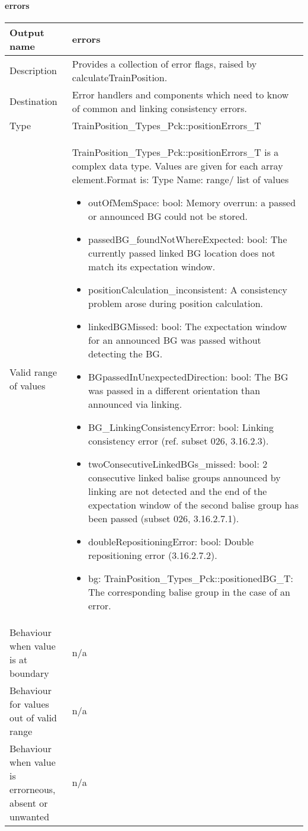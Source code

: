 \paragraph{errors}

\begin{longtable}{p{}p{}}
\toprule
Output name				& errors \\

\midrule
Description				& Provides a collection of error flags, raised by calculateTrainPosition.  \newline
  \\
\midrule
Destination				& Error handlers and components which need to know of common and linking consistency errors.  \\ 
\midrule
Type					& TrainPosition\_Types\_Pck::positionErrors\_T \\  
\midrule
Valid range of values	& TrainPosition\_Types\_Pck::positionErrors\_T is a complex data type. Values are given for each array element.\newline Format is: Type Name: range/ list of values
\begin{itemize}
\item outOfMemSpace: bool: Memory overrun: a passed or announced BG could not be stored.
\item passedBG\_foundNotWhereExpected: bool: The currently passed linked BG location does not match its expectation window.
\item positionCalculation\_inconsistent: A consistency problem arose during position calculation.
\item linkedBGMissed: bool: The expectation window for an announced BG was passed without detecting the BG.
\item BGpassedInUnexpectedDirection: bool: The BG was passed in a different orientation than announced via linking.
\item BG\_LinkingConsistencyError: bool: Linking consistency error (ref. subset 026, 3.16.2.3).
\item twoConsecutiveLinkedBGs\_missed: bool: 2 consecutive linked balise groups announced by linking are not detected and the end of the expectation window of the second balise group has been passed (subset 026, 3.16.2.7.1).
\item doubleRepositioningError: bool: Double repositioning error (3.16.2.7.2).
\item bg: TrainPosition\_Types\_Pck::positionedBG\_T: The corresponding balise group in the case of an error.

\end{itemize}  \\

\midrule
Behaviour when value is at boundary	& n/a \\
\midrule
Behaviour for values out of valid range	& n/a \\

\midrule
Behaviour when value is errorneous, absent or unwanted & n/a \\

\bottomrule
\end{longtable}


